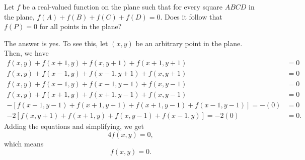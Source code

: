 \begin{problem}[Putnam 2009 - A1]
Let $f$ be a real-valued function on the plane such that for every square $ABCD$ in the plane, $f(A) + f(B) + f(C) + f(D) = 0$. Does it follow that $f(P) = 0$ for all points in the plane?
\end{problem}

The answer is yes. To see this, let $(x, y)$ be an arbitrary point in the plane. Then, we have 
\begin{align*}
f(x, y) + f(x+1, y) + f(x, y+1) + f(x+1, y+1) &= 0
\\
f(x, y) + f(x-1, y) + f(x-1, y+1) + f(x, y+1) &= 0
\\
f(x, y) + f(x-1, y) + f(x-1, y-1) + f(x, y-1) &= 0
\\
f(x, y) + f(x+1, y) + f(x+1, y-1) + f(x, y-1) &= 0
\\
- \left[ f(x-1, y-1) + f(x+1, y+1) + f(x+1, y-1) + f(x-1, y-1) \right] = -(0) &= 0
\\
-2 \left[ f(x, y+1) + f(x+1, y) + f(x, y-1) + f(x-1, y) \right] = -2(0) &= 0.
\end{align*}
Adding the equations and simplifying, we get $$4f(x, y) = 0,$$
which means
$$f(x, y) = 0.$$
